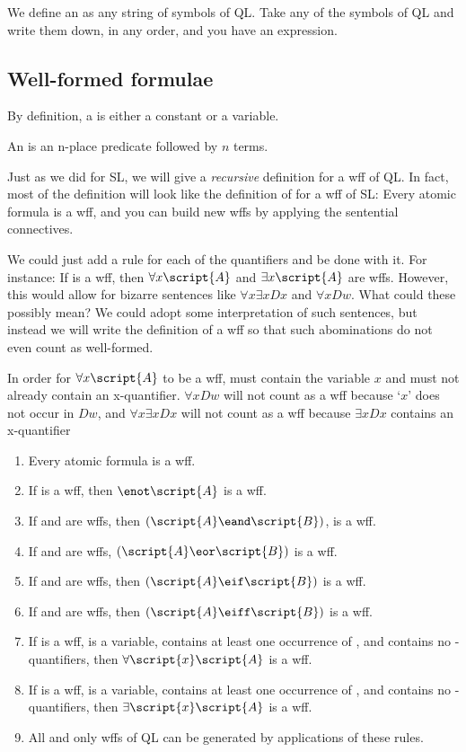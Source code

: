 We define an  as any string of symbols of QL. Take any of the symbols of QL and write them down, in any order, and you have an expression.

\subsection{Well-formed formulae}

By definition, a  is either a constant or a variable.

An  is an n-place predicate followed by $n$ terms.

Just as we did for SL, we will give a \emph{recursive} definition for a wff of QL. In fact, most of the definition will look like the definition of for a wff of SL: Every atomic formula is a wff, and you can build new wffs by applying the sentential connectives.

We could just add a rule for each of the quantifiers and be done with it. For instance: If  is a wff, then $\forall x\script{A}$ and $\exists x\script{A}$ are wffs. However, this would allow for bizarre sentences like $\forall x\exists x Dx$ and $\forall x Dw$. What could these possibly mean? We could adopt some interpretation of such sentences, but instead we will write the definition of a wff so that such abominations do not even count as well-formed. 

In order for $\forall x\script{A}$ to be a wff,  must contain the variable $x$ and must not already contain an x-quantifier. $\forall x Dw$ will not count as a wff because `$x$' does not occur in $Dw$, and $\forall x \exists x Dx$ will not count as a wff because $\exists x Dx$ contains an x-quantifier

\begin{enumerate}
\item Every atomic formula is a wff.
\item If  is a wff, then $\enot\script{A}$ is a wff.
\item If  and  are wffs, then $(\script{A}\eand\script{B})$, is a wff.
\item If  and  are wffs, $(\script{A}\eor\script{B})$ is a wff.
\item If  and  are wffs, then $(\script{A}\eif\script{B})$ is a wff.
\item If  and  are wffs, then $(\script{A}\eiff\script{B})$ is a wff.
\item If  is a wff,  is a variable,  contains at least one occurrence of , and  contains no -quantifiers, then $\forall\script{x}\script{A}$ is a wff.
\item If  is a wff,  is a variable,  contains at least one occurrence of , and  contains no -quantifiers, then $\exists\script{x}\script{A}$ is a wff.
\item All and only wffs of QL can be generated by applications of these rules.
\end {enumerate}

